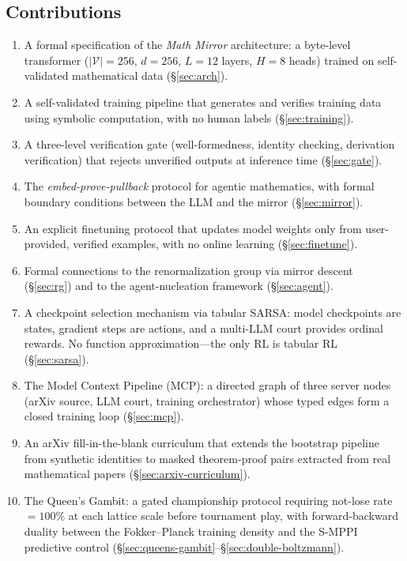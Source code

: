 \documentclass[11pt,a4paper]{article}
\newcommand{\cV}{\mathcal{V}}
\begin{document}
\subsection{Contributions}

\begin{enumerate}[nosep]
\item A formal specification of the \emph{Math Mirror} architecture:
  a byte-level transformer ($|\cV| = 256$, $d = 256$,
  $L = 12$ layers, $H = 8$ heads) trained on self-validated
  mathematical data (\S\ref{sec:arch}).

\item A self-validated training pipeline
  that generates and verifies training data using symbolic
  computation, with no human labels (\S\ref{sec:training}).

\item A three-level verification gate
  (well-formedness, identity checking, derivation verification)
  that rejects unverified outputs at inference time (\S\ref{sec:gate}).

\item The \emph{embed-prove-pullback} protocol
  for agentic mathematics, with formal boundary conditions
  between the LLM and the mirror (\S\ref{sec:mirror}).

\item An explicit finetuning protocol
  that updates model weights only from user-provided,
  verified examples, with no online learning (\S\ref{sec:finetune}).

\item Formal connections to the renormalization group
  via mirror descent (\S\ref{sec:rg}) and to the
  agent-nucleation framework (\S\ref{sec:agent}).

\item A checkpoint selection mechanism via tabular SARSA\@:
  model checkpoints are states, gradient steps are actions,
  and a multi-LLM court provides ordinal rewards.
  No function approximation---the only RL is tabular RL
  (\S\ref{sec:sarsa}).

\item The Model Context Pipeline (MCP): a directed graph of
  three server nodes (arXiv source, LLM court, training
  orchestrator) whose typed edges form a closed training
  loop (\S\ref{sec:mcp}).

\item An arXiv fill-in-the-blank curriculum that extends the
  bootstrap pipeline from synthetic identities to masked
  theorem-proof pairs extracted from real mathematical
  papers (\S\ref{sec:arxiv-curriculum}).

\item The Queen's Gambit: a gated championship protocol
  requiring not-lose rate $= 100\%$ at each lattice scale
  before tournament play, with forward-backward duality
  between the Fokker--Planck training density and the
  S-MPPI predictive control
  (\S\ref{sec:queens-gambit}--\S\ref{sec:double-boltzmann}).
\end{enumerate}
\end{document}
